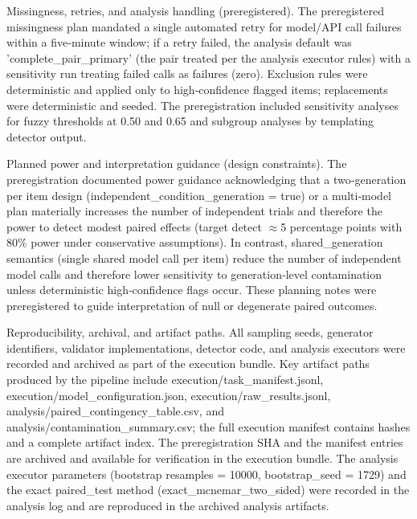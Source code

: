 \documentclass[conference]{IEEEtran}
\begin{document}
Missingness, retries, and analysis handling (preregistered). The preregistered missingness plan mandated a single automated retry for model/API call failures within a five‑minute window; if a retry failed, the analysis default was 'complete\_pair\_primary' (the pair treated per the analysis executor rules) with a sensitivity run treating failed calls as failures (zero). Exclusion rules were deterministic and applied only to high‑confidence flagged items; replacements were deterministic and seeded. The preregistration included sensitivity analyses for fuzzy thresholds at 0.50 and 0.65 and subgroup analyses by templating detector output.

Planned power and interpretation guidance (design constraints). The preregistration documented power guidance acknowledging that a two‑generation per item design (independent\_condition\_generation = true) or a multi‑model plan materially increases the number of independent trials and therefore the power to detect modest paired effects (target detect \ensuremath{\approx}5 percentage points with 80\% power under conservative assumptions). In contrast, shared\_generation semantics (single shared model call per item) reduce the number of independent model calls and therefore lower sensitivity to generation‑level contamination unless deterministic high‑confidence flags occur. These planning notes were preregistered to guide interpretation of null or degenerate paired outcomes.

Reproducibility, archival, and artifact paths. All sampling seeds, generator identifiers, validator implementations, detector code, and analysis executors were recorded and archived as part of the execution bundle. Key artifact paths produced by the pipeline include execution/task\_manifest.jsonl, execution/model\_configuration.json, execution/raw\_results.jsonl, analysis/paired\_contingency\_table.csv, and analysis/contamination\_summary.csv; the full execution manifest contains hashes and a complete artifact index. The preregistration SHA and the manifest entries are archived and available for verification in the execution bundle. The analysis executor parameters (bootstrap resamples = 10000, bootstrap\_seed = 1729) and the exact paired\_test method (exact\_mcnemar\_two\_sided) were recorded in the analysis log and are reproduced in the archived analysis artifacts.
\end{document}

